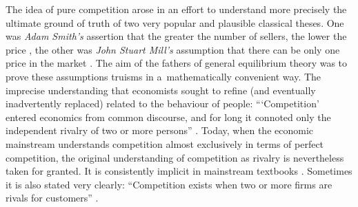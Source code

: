 The idea of pure competition arose in an effort to understand more precisely the ultimate ground of truth of two very popular and plausible classical theses. One was \textit{Adam Smith's} assertion that the greater the number of sellers, the lower the price 
\parencite[][pp.68–69]{smith_inquiry_1776}, %
 the other was \textit{John Stuart Mill's} assumption that there can be only one price in the market 
\parencite[][p.291]{mill_principles_1848}. %
 The aim of the fathers of general equilibrium theory was to prove these assumptions truisms in a~mathematically convenient way. The imprecise understanding that economists sought to refine (and eventually inadvertently replaced) related to the behaviour of people: ``‘Competition' entered economics from common discourse, and for long it connoted only the independent rivalry of two or more persons'' 
\parencite[][p.1]{stigler_perfect_1957}. %
 Today, when the economic mainstream understands competition almost exclusively in terms of perfect competition, the original understanding of competition as rivalry is nevertheless taken for granted. It is consistently implicit in mainstream textbooks 
\parencites[cf.][p.357]{acemoglu_microeconomics_2016}[][p.281 et passim]{pindyck_microeconomics_2013}[][p.241 et passim]{}[among others,][]{}. %
 Sometimes it is also stated very clearly: ``Competition exists when two or more firms are rivals for customers'' 
\parencite[][p.42]{mankiw_economics_2014}.%




